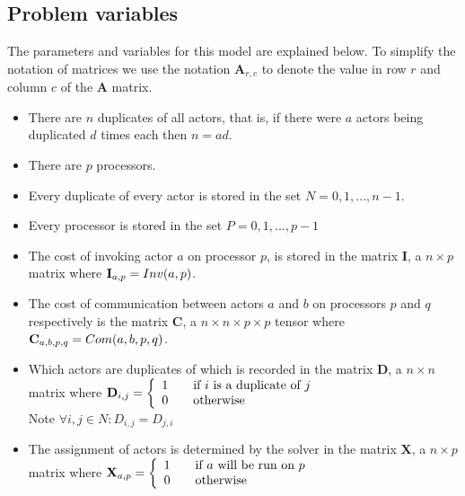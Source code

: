 \subsection{Problem variables}
\label{secModVars}


The parameters and variables for this model are explained below.
To simplify the notation of matrices we use the notation $\mathbf{A}_{r,c}$ to denote the value in row $r$ and column $c$ of the $\mathbf{A}$ matrix.

\begin{itemize}
	\item There are $n$ duplicates of all actors, that is, if there were $a$ actors being duplicated $d$ times each then $n = ad$.
	\item There are $p$ processors.
	\item Every duplicate of every actor is stored in the set $N = {0, 1, ..., n-1}$.
	\item Every processor is stored in the set $P = {0, 1, ..., p-1}$
	\item The cost of invoking actor $a$ on processor $p$, is stored in the matrix $\mathbf{I}$, a $n \times p$ matrix where $\mathbf{I}_{a,p} = Inv(a, p)$.
	\item The cost of communication between actors $a$ and $b$ on processors $p$ and $q$ respectively is the matrix $\mathbf{C}$, a $n \times n \times p \times p$ tensor where $\mathbf{C}_{a,b,p,q} = Com(a, b, p, q)$.
	\item Which actors are duplicates of which is recorded in the matrix $\mathbf{D}$, a $n \times n$ matrix where $\mathbf{D}_{i,j} = \mbox{$\left\{ 
		\begin{array}{l l}
			1 \quad & \mbox{if $i$ is a duplicate of $j$}\\
			0 & \mbox{otherwise}\\ \end{array} \right.$}$ \\ Note $\forall i, j \in N : D_{i,j} = D_{j,i}$ 
	\item The assignment of actors is determined by the solver in the matrix $\mathbf{X}$, a $n \times p$ matrix where $\mathbf{X}_{a,p} = \mbox{$\left\{ 
		\begin{array}{l l}
			1 \quad & \mbox{if $a$ will be run on $p$}\\
			0 & \mbox{otherwise}\\ \end{array} \right.$}$
\end{itemize}


